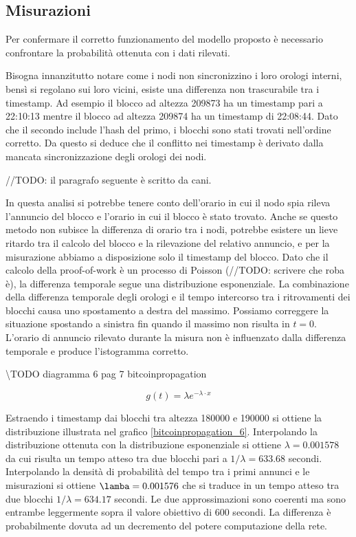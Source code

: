 \subsection{Misurazioni}\label{misurazioni}

Per confermare il corretto funzionamento del modello proposto è
necessario confrontare la probabilità ottenuta con i dati rilevati.

Bisogna innanzitutto notare come i nodi non sincronizzino i loro orologi
interni, bensì si regolano sui loro vicini, esiste una differenza non
trascurabile tra i timestamp. Ad esempio il blocco ad altezza 209873 ha
un timestamp pari a 22:10:13 mentre il blocco ad altezza 209874 ha un
timestamp di 22:08:44. Dato che il secondo include l'hash del primo, i
blocchi sono stati trovati nell'ordine corretto. Da questo si deduce che
il conflitto nei timestamp è derivato dalla mancata sincronizzazione
degli orologi dei nodi.

//TODO: il paragrafo seguente è scritto da cani.

In questa analisi si potrebbe tenere conto dell'orario in cui il nodo
spia rileva l'annuncio del blocco e l'orario in cui il blocco è stato
trovato. Anche se questo metodo non subisce la differenza di orario tra
i nodi, potrebbe esistere un lieve ritardo tra il calcolo del blocco e
la rilevazione del relativo annuncio, e per la misurazione abbiamo a
disposizione solo il timestamp del blocco. Dato che il calcolo della
proof-of-work è un processo di Poisson (//TODO: scrivere che roba è), la
differenza temporale segue una distribuzione esponenziale. La
combinazione della differenza temporale degli orologi e il tempo
intercorso tra i ritrovamenti dei blocchi causa uno spostamento a destra
del massimo. Possiamo correggere la situazione spostando a sinistra fin
quando il massimo non risulta in $t=0$. L'orario di annuncio rilevato
durante la misura non è influenzato dalla differenza temporale e produce
l'istogramma corretto.

\textbackslash{}TODO diagramma 6 pag 7 bitcoinpropagation

\[ g(t) = \lambda e^{-\lambda \cdot x}\]

Estraendo i timestamp dai blocchi tra altezza 180000 e 190000 si ottiene
la distribuzione illustrata nel grafico \ref{bitcoinpropagation_6}.
Interpolando la distribuzione ottenuta con la distribuzione esponenziale
si ottiene $\lambda = 0.001578$ da cui risulta un tempo atteso tra due
blocchi pari a $1 / \lambda = 633.68$ secondi. Interpolando la densità
di probabilità del tempo tra i primi annunci e le misurazioni si ottiene
$\lamba = 0.001576$ che si traduce in un tempo atteso tra due blocchi
$1/ \lambda = 634.17$ secondi. Le due approssimazioni sono coerenti ma
sono entrambe leggermente sopra il valore obiettivo di 600 secondi. La
differenza è probabilmente dovuta ad un decremento del potere
computazione della rete.

